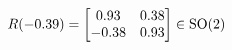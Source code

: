 \documentclass[preview]{standalone}
\begin{document}
\begin{align*}
\special{dvisvgm:raw <g id='unique000'>}R(-0.39) = \begin{bmatrix} 0.93 & 0.38 \\ -0.38 & 0.93 \end{bmatrix} \in \text{SO}(2)\special{dvisvgm:raw </g>}
\end{align*}
\end{document}

